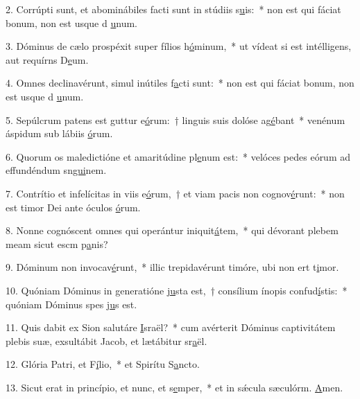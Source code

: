 2. Corrúpti sunt, et abominábiles facti sunt in stúdiis s\uline{u}is:~* non est qui fáciat bonum, non est usque d \uline{u}num.\par 
3. Dóminus de cælo prospéxit super fílios h\uline{ó}minum,~* ut vídeat si est intélligens, aut requírns D\uline{e}um.\par 
4. Omnes declinavérunt, simul inútiles f\uline{a}cti sunt:~* non est qui fáciat bonum, non est usque d \uline{u}num.\par 
5. Sepúlcrum patens est guttur e\uline{ó}rum:~† linguis suis dolóse ag\uline{é}bant~* venénum áspidum sub lábiis \uline{ó}rum.\par 
6. Quorum os maledictióne et amaritúdine pl\uline{e}num est:~* velóces pedes eórum ad effundéndum sn\uline{gui}nem.\par 
7. Contrítio et infelícitas in viis e\uline{ó}rum,~† et viam pacis non cognov\uline{é}runt:~* non est timor Dei ante óculos \uline{ó}rum.\par 
8. Nonne cognóscent omnes qui operántur iniquit\uline{á}tem,~* qui dévorant plebem meam sicut escm p\uline{a}nis?\par 
9. Dóminum non invocav\uline{é}runt,~* illic trepidavérunt timóre, ubi non ert t\uline{i}mor.\par 
10. Quóniam Dóminus in generatióne \uline{ju}sta est,~† consílium ínopis confud\uline{í}stis:~* quóniam Dóminus spes j\uline{u}s est.\par 
11. Quis dabit ex Sion salutáre \uline{I}sraël?~* cum avérterit Dóminus captivitátem plebis suæ, exsultábit Jacob, et lætábitur sr\uline{a}ël.\par 
12. Glória Patri, et F\uline{í}lio,~* et Spirítu S\uline{a}ncto.\par 
13. Sicut erat in princípio, et nunc, et s\uline{e}mper,~* et in sǽcula sæculórm. \uline{A}men.\par 
